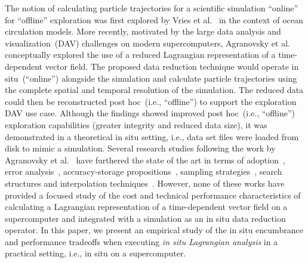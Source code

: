 The notion of calculating particle trajectories for a scientific simulation ``online'' for ``offline'' exploration was first explored by Vries et al.~\cite{vries2001calculating} in the context of ocean circulation models.
%
More recently, motivated by the large data analysis and visualization~(DAV) challenges on modern supercomputers, Agranovsky et al.~\cite{agranovsky2014improved} conceptually explored the use of a reduced Lagrangian representation of a time-dependent vector field.
%
The proposed data reduction technique would operate in situ~(``online'') alongside the simulation and calculate particle trajectories using the complete spatial and temporal resolution of the simulation.
%
The reduced data could then be reconstructed post hoc~(i.e., ``offline'') to support the exploration DAV use case.
%
Although the findings showed improved post hoc~(i.e., ``offline'') exploration capabilities (greater integrity and reduced data size), it was demonstrated in a theoretical in situ setting, i.e., data set files were loaded from disk to mimic a simulation.
%
Several research studies following the work by Agranovsky et al.~\cite{agranovsky2014improved} have furthered the state of the art in terms of adoption~\cite{envirvis.20171099,siegfried2019tropical}, error analysis~\cite{bujack2015lagrangian, hummel2016error, chandler2016analysis}, accuracy-storage propositions~\cite{sane2018revisiting}, sampling strategies~\cite{rapp2019void, sane2019interpolation}, search structures and interpolation techniques~\cite{chandler2015interpolation, sane2019interpolation}. 
%
However, none of these works have provided a focused study of the cost and technical performance characteristics of calculating a Lagrangian representation of a time-dependent vector field on a supercomputer and integrated with a simulation as an in situ data reduction operator.
%
In this paper, we present an empirical study of the in situ encumbrance and performance tradeoffs when executing \textit{in situ Lagrangian analysis} in a practical setting, i.e., in situ on a supercomputer.

